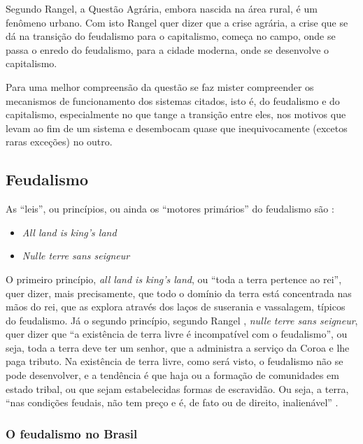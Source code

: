\documentclass[
	12pt,				%
	oneside,			%
	a4paper,			%
	chapter=TITLE,		%
	section=TITLE,		%
	english,			%
	brazil				%
	]{abntex2}
\begin{document}
Segundo Rangel, a Questão Agrária, embora nascida na área rural, é um fenômeno
urbano. Com isto Rangel quer dizer que a crise agrária, a crise que se dá na
transição do feudalismo para o capitalismo, começa no campo, onde se passa o
enredo do feudalismo, para a cidade moderna, onde se desenvolve o capitalismo.

Para uma melhor compreensão da questão se faz mister compreender os mecanismos
de funcionamento dos sistemas citados, isto é, do feudalismo e do capitalismo,
especialmente no que tange a transição entre eles, nos motivos que levam ao
fim de um sistema e desembocam quase que inequivocamente (excetos raras
exceções) no outro.

\hypertarget{feudalismo}{%
\subsection{Feudalismo}\label{feudalismo}}

As ``leis'', ou princípios, ou ainda os ``motores primários'' do feudalismo são
\autocite[126]{rangel1985}:
\begin{itemize}
\tightlist
\item
  \emph{All land is king's land}
\item
  \emph{Nulle terre sans seigneur}
\end{itemize}
O primeiro princípio, \emph{all land is king's land}, ou ``toda a terra pertence ao
rei'', quer dizer, mais precisamente, que todo o domínio da terra está
concentrada nas mãos do rei, que as explora através dos laços de suserania e
vassalagem, típicos do feudalismo. Já o segundo princípio, segundo Rangel
\autocite*[219]{rangel1961}, \emph{nulle terre sans seigneur}, quer dizer que ``a existência
de terra livre é incompatível com o feudalismo'', ou seja, toda a terra deve ter
um senhor, que a administra a serviço da Coroa e lhe paga tributo. Na existência
de terra livre, como será visto, o feudalismo não se pode desenvolver, e a
tendência é que haja ou a formação de comunidades em estado tribal, ou que sejam
estabelecidas formas de escravidão. Ou seja, a terra, ``nas condições feudais,
não tem preço e é, de fato ou de direito, inalienável'' \autocite[206]{rangel1960}.

\hypertarget{o-feudalismo-no-brasil}{%
\subsubsection{O feudalismo no Brasil}\label{o-feudalismo-no-brasil}}
\end{document}
